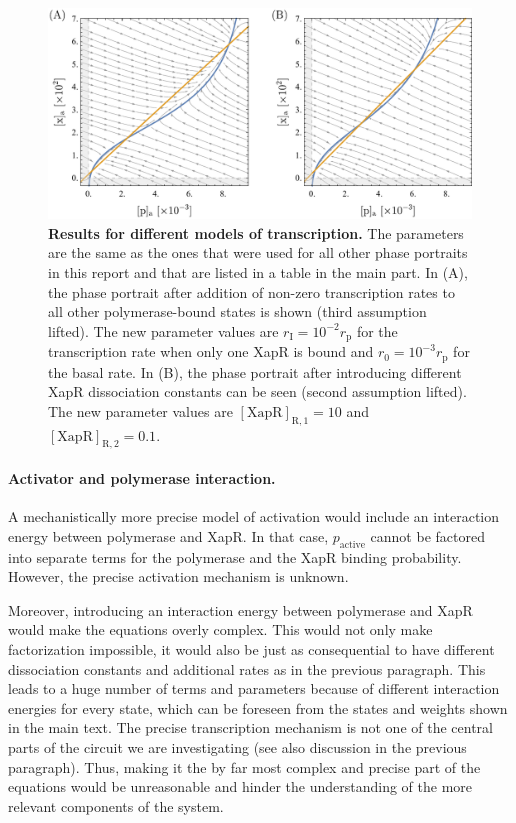 \documentclass[10pt,letterpaper]{article}
\newcommand{\n}[1]{\mathrm{#1}}
\begin{document}
\begin{figure}
	\centering
	\includegraphics[width=\textwidth]{FigSI1.pdf}
	\caption{{\bf Results for different models of transcription.}
		The parameters are the same as the ones that were used for all other phase portraits in this report and that are listed in a table in the main part. In (A), the phase portrait after addition of non-zero transcription rates to all other polymerase-bound states is shown (third assumption lifted). The new parameter values are $r_{\n{I}} = 10^{-2} r_{\n{p}}$ for the transcription rate when only one XapR is bound and $r_{\n{0}} = 10^{-3} r_{\n{p}}$ for the basal rate. In (B), the phase portrait after introducing different XapR dissociation constants can be seen (second assumption lifted). The new parameter values are $\n{[XapR]_{R,1}} = 10$ and $\n{[XapR]_{R,2}} = 0.1$.}
	\label{figS1:transcription}
\end{figure}

\paragraph*{Activator and polymerase interaction.} A mechanistically more precise model of activation would include an interaction energy between polymerase and XapR. In that case, $p_{\n{active}}$ cannot be factored into separate terms for the polymerase and the XapR binding probability. However, the precise activation mechanism is unknown.

Moreover, introducing an interaction energy between polymerase and XapR would make the equations overly complex. This would not only make factorization impossible, it would also be just as consequential to have different dissociation constants and additional rates as in the previous paragraph. This leads to a huge number of terms and parameters because of different interaction energies for every state, which can be foreseen from the states and weights shown in the main text. The precise transcription mechanism is not one of the central parts of the circuit we are investigating (see also discussion in the previous paragraph). Thus, making it the by far most complex and precise part of the equations would be unreasonable and hinder the understanding of the more relevant components of the system.
\end{document}
